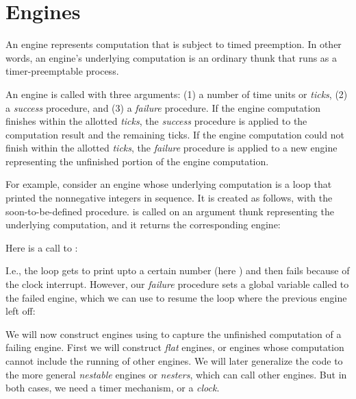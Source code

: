 \chapter{Engines}

An engine \cite{engine} represents computation that is
subject to timed preemption.  In other words, an
engine’s underlying computation is an ordinary thunk
that runs as a timer-preemptable process.

An engine is called with three arguments: (1) a number
of time units or {\em ticks}, (2) a {\em success}
procedure, and (3) a {\em failure} procedure.  If the
engine computation finishes within the allotted {\em
ticks}, the {\em success} procedure is applied to the
computation result and the remaining ticks.  If the
engine computation could not finish within the allotted
{\em ticks}, the {\em failure} procedure is applied
to a new engine representing the unfinished portion of
the engine computation.

For example, consider an engine whose underlying
computation is a loop that printed the nonnegative
integers in sequence.  It is created as follows, with
the soon-to-be-defined  procedure.
 is called on an argument thunk
representing the underlying computation, and it
returns the corresponding engine:


\n Here is a call to :


\n I.e., the loop gets to print upto a certain number
(here ) and then fails because of the clock
interrupt.  However, our {\em failure} procedure sets
a global variable called  to the failed
engine, which we can use to resume the loop where the
previous engine left off:



We will now construct engines using  to
capture the unfinished computation of a failing engine.
First we will construct {\em flat} engines, or
engines whose computation cannot include the running of
other engines.  We will later generalize the code to
the more general {\em nestable} engines or {\em
nesters}, which can call other engines.  But in both
cases, we need a timer mechanism, or a {\em clock}.

